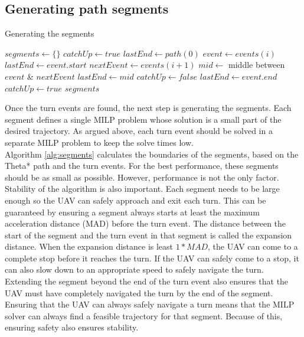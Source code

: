 \subsection{Generating path segments}
\begin{algorithm}
\caption{Generating the segments}
\label{alg:segments}
\begin{algorithmic}[1]
\State $segments \leftarrow \{\}$
\State $catchUp \leftarrow true$
\State $lastEnd \leftarrow path(0)$
\State $event \leftarrow events(i)$
	\State {} 
	\State {}
	\State $lastEnd \leftarrow event.start$
\EndIf
\State $nextEvent \leftarrow events(i+1)$
	\State $mid \leftarrow$ middle between $event$ \& $nextEvent$
	\State {}
	\State $lastEnd \leftarrow mid$
	\State $catchUp \leftarrow false$
\Else
	\State {} 
	\State {}
	\State $lastEnd \leftarrow event.end$
	\State $catchUp \leftarrow true$
\EndIf
\EndFor
\State {}
\Return $segments$
\EndFunction
\end{algorithmic}
\end{algorithm}
Once the turn events are found, the next step is generating the segments. Each segment defines a single MILP problem whose solution is a small part of the desired trajectory. As argued above, each turn event should be solved in a separate MILP problem to keep the solve times low. \\
Algorithm \ref{alg:segments} calculates the boundaries of the segments, based on the Theta* path and the turn events. For the best performance, these segments should be as small as possible. However, performance is not the only factor. Stability of the algorithm is also important. Each segment needs to be large enough so the UAV can safely approach and exit each turn. This can be guaranteed by ensuring a segment always starts at least the maximum acceleration distance (MAD) before the turn event. The distance between the start of the segment and the turn event in that segment is called the expansion distance. When the expansion distance is least $1*MAD$, the UAV can come to a complete stop before it reaches the turn. If the UAV can safely come to a stop, it can also slow down to an appropriate speed to safely navigate the turn. Extending the segment beyond the end of the turn event also ensures that the UAV must have completely navigated the turn by the end of the segment. Ensuring that the UAV can always safely navigate a turn means that the MILP solver can always find a feasible trajectory for that segment. Because of this, ensuring  safety also ensures stability. \\
